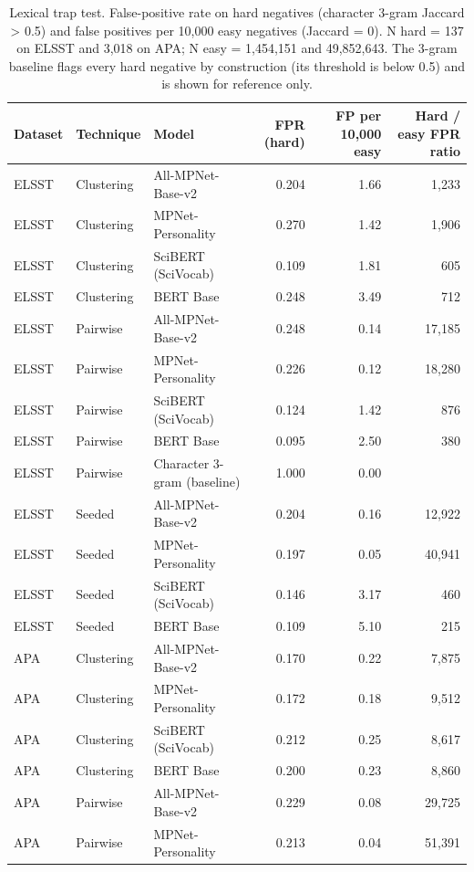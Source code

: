 \begin{table}[ht]
\centering
\small
\caption{Lexical trap test. False-positive rate on hard negatives (character 3-gram Jaccard > 0.5) and false positives per 10,000 easy negatives (Jaccard = 0). N hard = 137 on ELSST and 3,018 on APA; N easy = 1,454,151 and 49,852,643. The 3-gram baseline flags every hard negative by construction (its threshold is below 0.5) and is shown for reference only.}
\label{tab:table2_lexical_trap}
\begin{tabular}{lllrrr}
\toprule
Dataset & Technique & Model & FPR (hard) & FP per 10,000 easy & Hard / easy FPR ratio \\
\midrule
ELSST & Clustering & All-MPNet-Base-v2 & 0.204 & 1.66 & 1,233 \\
ELSST & Clustering & MPNet-Personality & 0.270 & 1.42 & 1,906 \\
ELSST & Clustering & SciBERT (SciVocab) & 0.109 & 1.81 & 605 \\
ELSST & Clustering & BERT Base & 0.248 & 3.49 & 712 \\
ELSST & Pairwise & All-MPNet-Base-v2 & 0.248 & 0.14 & 17,185 \\
ELSST & Pairwise & MPNet-Personality & 0.226 & 0.12 & 18,280 \\
ELSST & Pairwise & SciBERT (SciVocab) & 0.124 & 1.42 & 876 \\
ELSST & Pairwise & BERT Base & 0.095 & 2.50 & 380 \\
ELSST & Pairwise & Character 3-gram (baseline) & 1.000 & 0.00 &  \\
ELSST & Seeded & All-MPNet-Base-v2 & 0.204 & 0.16 & 12,922 \\
ELSST & Seeded & MPNet-Personality & 0.197 & 0.05 & 40,941 \\
ELSST & Seeded & SciBERT (SciVocab) & 0.146 & 3.17 & 460 \\
ELSST & Seeded & BERT Base & 0.109 & 5.10 & 215 \\
APA & Clustering & All-MPNet-Base-v2 & 0.170 & 0.22 & 7,875 \\
APA & Clustering & MPNet-Personality & 0.172 & 0.18 & 9,512 \\
APA & Clustering & SciBERT (SciVocab) & 0.212 & 0.25 & 8,617 \\
APA & Clustering & BERT Base & 0.200 & 0.23 & 8,860 \\
APA & Pairwise & All-MPNet-Base-v2 & 0.229 & 0.08 & 29,725 \\
APA & Pairwise & MPNet-Personality & 0.213 & 0.04 & 51,391 \\

\end{tabular}
\end{table}

